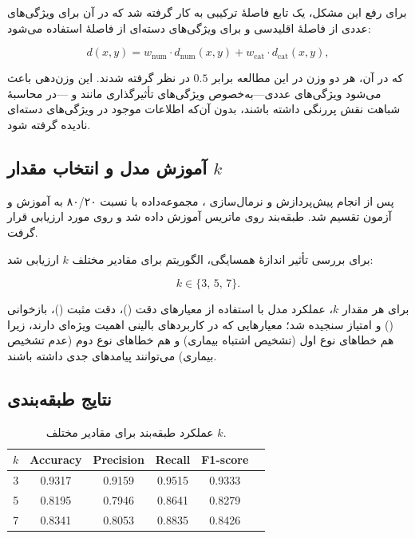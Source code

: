 برای رفع این مشکل، یک تابع فاصلهٔ ترکیبی به کار گرفته شد که در آن برای ویژگی‌های عددی از فاصلهٔ
اقلیدسی و برای ویژگی‌های دسته‌ای از فاصلهٔ  استفاده می‌شود:

\[
d(x,y) = w_{\text{num}} \cdot d_{\text{num}}(x,y) +
w_{\text{cat}} \cdot d_{\text{cat}}(x,y),
\]

که در آن، هر دو وزن در این مطالعه برابر $0.5$ در نظر گرفته شدند. این وزن‌دهی باعث می‌شود ویژگی‌های
عددی—به‌خصوص ویژگی‌های تأثیرگذاری مانند  و —در محاسبهٔ شباهت نقش پررنگی
داشته باشند، بدون آن‌که اطلاعات موجود در ویژگی‌های دسته‌ای نادیده گرفته شود.

\subsection{آموزش مدل و انتخاب مقدار $k$}

پس از انجام پیش‌پردازش و نرمال‌سازی ، مجموعه‌داده با نسبت ۸۰/۲۰ به آموزش و آزمون
تقسیم شد. طبقه‌بند  روی ماتریس  آموزش داده شد و روی
 مورد ارزیابی قرار گرفت.

برای بررسی تأثیر اندازهٔ همسایگی، الگوریتم  برای مقادیر مختلف $k$ ارزیابی شد:

\[
k \in \{3,\,5,\,7\}.
\]

برای هر مقدار $k$، عملکرد مدل با استفاده از معیارهای دقت ()، دقت مثبت ()،
بازخوانی () و امتیاز  سنجیده شد؛ معیارهایی که در کاربردهای بالینی اهمیت ویژه‌ای دارند،
زیرا هم خطاهای نوع اول (تشخیص اشتباه بیماری) و هم خطاهای نوع دوم (عدم تشخیص بیماری) می‌توانند
پیامدهای جدی داشته باشند.

\subsection{نتایج طبقه‌بندی}

\begin{table}[H]
	\centering
	\caption{عملکرد طبقه‌بند  برای مقادیر مختلف $k$.}
	\label{table:knn-results}
	\begin{tabular}{cccccc}
		\toprule
		$k$ & Accuracy & Precision & Recall & F1-score \\
		\midrule
		3 & 0.9317 & 0.9159 & 0.9515 & 0.9333 \\
		5 & 0.8195 & 0.7946 & 0.8641 & 0.8279 \\
		7 & 0.8341 & 0.8053 & 0.8835 & 0.8426 \\
		\bottomrule
	\end{tabular}
\end{table}

